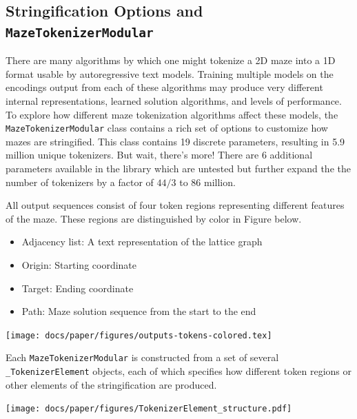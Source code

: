 \documentclass[10pt,a4paper,onecolumn]{article}
\let\origfigure\figure
\let\endorigfigure\endfigure
\renewenvironment{figure}[1][2] {
    \expandafter\origfigure\expandafter[H]
} {
    \endorigfigure
}
\providecommand{\tightlist}{%
  \setlength{\itemsep}{0pt}\setlength{\parskip}{0pt}}
\begin{document}
\hypertarget{mtm}{%
\subsection{\texorpdfstring{Stringification Options and
\texttt{MazeTokenizerModular}}{Stringification Options and MazeTokenizerModular}}\label{mtm}}

There are many algorithms by which one might tokenize a 2D maze into a
1D format usable by autoregressive text models. Training multiple models
on the encodings output from each of these algorithms may produce very
different internal representations, learned solution algorithms, and
levels of performance. To explore how different maze tokenization
algorithms affect these models, the \texttt{MazeTokenizerModular} class
contains a rich set of options to customize how mazes are stringified.
This class contains 19 discrete parameters, resulting in 5.9 million
unique tokenizers. But wait, there's more! There are 6 additional
parameters available in the library which are untested but further
expand the the number of tokenizers by a factor of \(44/3\) to 86
million.

All output sequences consist of four token regions representing
different features of the maze. These regions are distinguished by color
in Figure below.

\begin{itemize}
\tightlist
\item
  {Adjacency list}: A text representation of the lattice graph
\item
  {Origin}: Starting coordinate
\item
  {Target}: Ending coordinate
\item
  {Path}: Maze solution sequence from the start to the end
\end{itemize}

\begin{figure}
\centering
\texttt{[image: docs/paper/figures/outputs-tokens-colored.tex]}
\caption{Example text output format with token regions highlighted.}
\end{figure}

Each \texttt{MazeTokenizerModular} is constructed from a set of several
\texttt{\_TokenizerElement} objects, each of which specifies how
different token regions or other elements of the stringification are
produced.

\begin{figure}
\centering
\texttt{[image: docs/paper/figures/TokenizerElement\_structure.pdf]}
\caption{Nested internal structure of \texttt{\_TokenizerElement}
objects inside a typical \texttt{MazeTokenizerModular} object.}
\end{figure}
\end{document}
